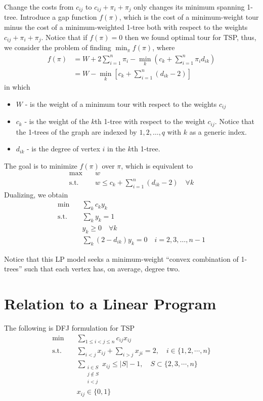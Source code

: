 			Change the costs from $c_{ij}$ to $c_{ij} + \pi_i + \pi_j$ only changes its minimum spanning 1-tree. Introduce a gap function $f(\pi)$, which is the cost of a minimum-weight tour minus the cost of a minimum-weighted 1-tree both with respect to the weights $c_{ij} + \pi_i + \pi_j$. Notice that if $f(\pi) = 0$ then we found optimal tour for TSP, thus, we consider the problem of finding $\min_\pi f(\pi)$, where
			\begin{align*}
				f(\pi) &= W + 2 \sum_{i = 1}^n \pi_i - \min_k (c_k + \sum_{i = 1}^n \pi_i d_{ik})\\
					   &= W - \min_k [c_k + \sum_{i = 1}^n (d_{ik} - 2)]
			\end{align*}
			in which
			\begin{itemize}
				\item $W$ - is the weight of a minimum tour with respect to the weights $c_{ij}$
				\item $c_k$ - is the weight of the $k$th 1-tree with respect to the weight $c_{ij}$. Notice that the 1-trees of the graph are indexed by $1, 2, \dots, q$ with $k$ as a generic index.
				\item $d_{ik}$ - is the degree of vertex $i$ in the $k$th 1-tree.
			\end{itemize}

			The goal is to minimize $f(\pi)$ over $\pi$, which is equivalent to
			\begin{align*}
				\max \quad & w\\
				\text{s.t.} \quad & w \le c_k + \sum_{i = 1}^n (d_{ik} - 2) \quad \forall k
			\end{align*}
			Dualizing, we obtain
			\begin{align*}
				\min \quad & \sum_{k} c_k y_k\\
				\text{s.t.} \quad & \sum_k y_k = 1\\
				& y_k \ge 0 \quad \forall k\\
				& \sum_k (2 - d_{ik}) y_k = 0 \quad i = 2, 3, \ldots, n-1
			\end{align*}

			Notice that this LP model seeks a minimum-weight ``convex combination of 1-trees'' such that each vertex has, on average, degree two.

		\section{Relation to a Linear Program}
			The following is DFJ formulation for TSP
			\begin{align*}
				\min \quad & \sum_{1 \le i < j \le n}c_{ij} x_{ij}\\
				\text{s.t.} \quad & \sum_{i < j} x_{ij} + \sum_{i > j} x_{ji} = 2, \quad i \in \{1, 2, \cdots, n\}\\
								  & \sum_{\substack{i \in S \\ j \notin S \\ i < j}} x_{ij} \le |S| - 1, \quad S \subset \{2, 3, \cdots, n\}\\
								  & x_{ij} \in \{0, 1\}
			\end{align*}

